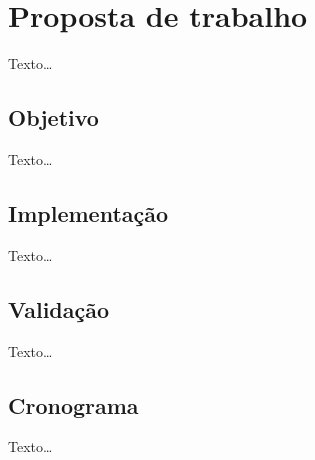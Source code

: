 
\section{Proposta de trabalho}
\label{sec:section6}
Texto\ldots

\subsection{Objetivo}
Texto\ldots

\subsection{Implementação}
Texto\ldots

\subsection{Validação}
Texto\ldots

\subsection{Cronograma}
Texto\ldots
